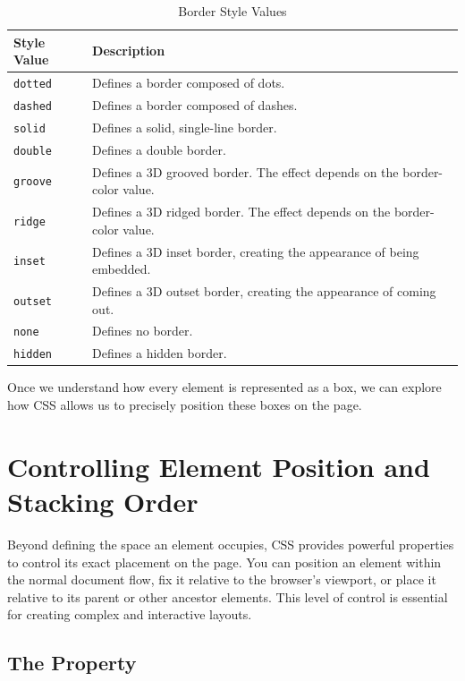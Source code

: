 \documentclass{scrbook}
\begin{document}
\begin{table}[h]
    \centering
    \begin{tabular}{|l|l|}
    \hline
    \textbf{Style Value} & \textbf{Description} \\
    \hline
    \texttt{dotted} & Defines a border composed of dots. \\
    \hline
    \texttt{dashed} & Defines a border composed of dashes. \\
    \hline
    \texttt{solid} & Defines a solid, single-line border. \\
    \hline
    \texttt{double} & Defines a double border. \\
    \hline
    \texttt{groove} & Defines a 3D grooved border. The effect depends on the border-color value. \\
    \hline
    \texttt{ridge} & Defines a 3D ridged border. The effect depends on the border-color value. \\
    \hline
    \texttt{inset} & Defines a 3D inset border, creating the appearance of being embedded. \\
    \hline
    \texttt{outset} & Defines a 3D outset border, creating the appearance of coming out. \\
    \hline
    \texttt{none} & Defines no border. \\
    \hline
    \texttt{hidden} & Defines a hidden border. \\
    \hline
    \end{tabular}
    \caption{Border Style Values}
    \label{tbl:border_style_values}
\end{table}

Once we understand how every element is represented as a box, we can explore how CSS allows us to precisely position these boxes on the page.

\chapter{Controlling Element Position and Stacking Order}

Beyond defining the space an element occupies, CSS provides powerful properties to control its exact placement on the page. You can position an element within the normal document flow, fix it relative to the browser's viewport, or place it relative to its parent or other ancestor elements. This level of control is essential for creating complex and interactive layouts.

\section{The Property}
\end{document}
